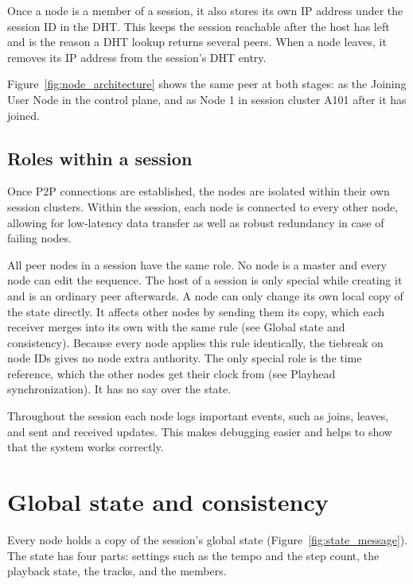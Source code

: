 \documentclass{article}
\begin{document}
Once a node is a member of a session, it also stores its own IP address under the session ID in the DHT. This keeps the session reachable after the host has left and is the reason a DHT lookup returns several peers. When a node leaves, it removes its IP address from the session's DHT entry.

Figure~\ref{fig:node_architecture} shows the same peer at both stages: as the Joining User Node in the control plane, and as Node 1 in session cluster A101 after it has joined.

\subsection{Roles within a session}

Once P2P connections are established, the nodes are isolated within their own session clusters. Within the session, each node is connected to every other node, allowing for low-latency data transfer as well as robust redundancy in case of failing nodes.

All peer nodes in a session have the same role. No node is a master and every node can edit the sequence. The host of a session is only special while creating it and is an ordinary peer afterwards. A node can only change its own local copy of the state directly. It affects other nodes by sending them its copy, which each receiver merges into its own with the same rule (see Global state and consistency). Because every node applies this rule identically, the tiebreak on node IDs gives no node extra authority. The only special role is the time reference, which the other nodes get their clock from (see Playhead synchronization). It has no say over the state.

Throughout the session each node logs important events, such as joins, leaves, and sent and received updates. This makes debugging easier and helps to show that the system works correctly.

\section{Global state and consistency}

Every node holds a copy of the session's global state (Figure~\ref{fig:state_message}). The state has four parts: settings such as the tempo and the step count, the playback state, the tracks, and the members.
\end{document}
